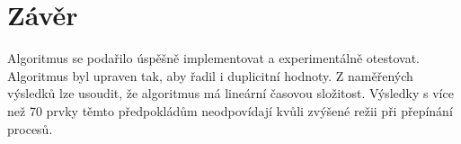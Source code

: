 \documentclass[11pt,a4paper]{article}
\begin{document}
\section{Závěr}

Algoritmus se podařilo úspěšně implementovat a experimentálně otestovat. Algoritmus byl upraven tak, aby řadil i duplicitní hodnoty. Z naměřených výsledků lze usoudit, že algoritmus má lineární časovou složitost. Výsledky s více než 70 prvky těmto předpokládům neodpovídají kvůli zvýšené režii při přepínání procesů.


%

%
\end{document}
